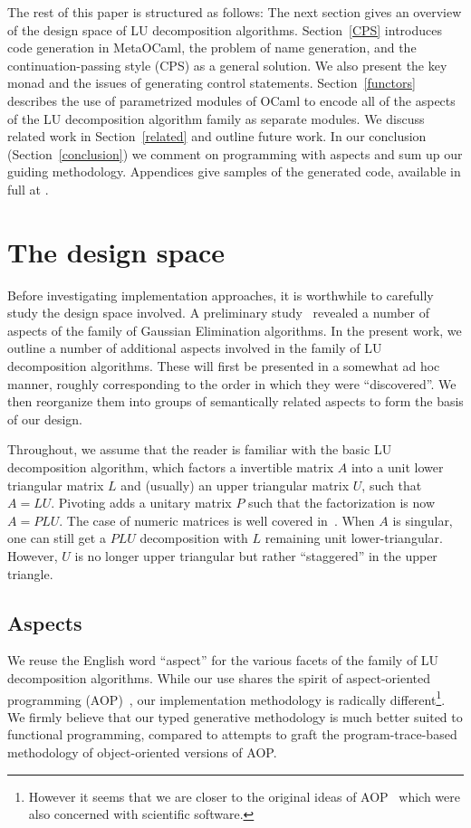 \documentclass{elsart}
\begin{document}
The rest of this paper is structured as follows: The next section
gives an overview of the design space of LU decomposition algorithms.
Section~\ref{CPS}
introduces code generation in MetaOCaml, the problem of name
generation, and the continuation-passing style (CPS) as a general
solution.  We also present the key monad and the issues of generating
control statements. Section~\ref{functors} describes the use of
parametrized modules of OCaml to encode all of the aspects of the
LU decomposition algorithm family as separate
modules.  We discuss related work in
Section~\ref{related} and outline future work. In our
conclusion (Section~\ref{conclusion}) we comment
on programming with aspects and sum up our guiding methodology.
Appendices give samples of the generated code, available in
full at \cite{metamonadsURL}.

\section{The design space}\label{design}

Before investigating implementation approaches, it is worthwhile to
carefully study the design space involved.  A preliminary
study~\cite{Carette06} revealed a number of aspects of the family of
Gaussian Elimination algorithms.  In the present work, we outline a
number of additional aspects involved in the family of LU
decomposition algorithms.  These will first be presented in a somewhat
ad hoc manner, roughly corresponding to the order in which they were
``discovered''.  We then reorganize them into groups of
semantically related aspects to form the basis of our design.

Throughout, we assume that the reader is familiar with the basic LU
decomposition algorithm, which factors a invertible matrix $A$ into a unit
lower triangular matrix $L$ and (usually) an upper triangular matrix $U$,
such that $A = LU$.  Pivoting adds a unitary matrix $P$ such
that the factorization is now $A = PLU$.  The case of numeric matrices is well
covered in~\cite{Golub-vanLoan}.  When $A$ is singular, one can still get
a $PLU$ decomposition with $L$ remaining unit lower-triangular. However, 
$U$ is no longer upper triangular but rather ``staggered''
in the upper triangle.

\subsection{Aspects}

We reuse the English word ``aspect'' for the various facets of the family
of LU decomposition algorithms.  While our use shares the 
spirit of aspect-oriented programming (AOP)~\cite{kiczales97aspectoriented},
our implementation methodology is radically different\footnote{However it seems
that we are closer to the original ideas of AOP~\cite{709568,mendhekar97rg}
which were also concerned with scientific software.}.  We firmly believe that
our typed generative methodology is much better suited to functional
programming, compared to attempts to graft the program-trace-based
methodology of object-oriented versions of AOP.  
\end{document}

